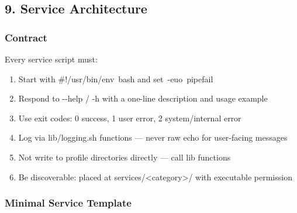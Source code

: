 \documentclass[11pt, a4paper, DIV=14]{scrartcl}
\renewcommand{\texttt}[1]{{\ttfamily\fontsize{8.5}{10.5}\selectfont\color{BabbNavy}#1}}
\let\origRule\rule
\renewcommand{\rule}[2]{\par\noindent{\color{BabbBorder}\origRule{#1}{#2}}\par}
\begin{document}
\begin{center}\rule{0.5\linewidth}{0.5pt}\end{center}

\subsection{9. Service Architecture}\label{service-architecture}

\subsubsection{Contract}\label{contract}

Every service script must:

\begin{enumerate}
\def\labelenumi{\arabic{enumi}.}
\tightlist
\item
  Start with \texttt{\#!/usr/bin/env\ bash} and
  \texttt{set\ -euo\ pipefail}
\item
  Respond to \texttt{-\/-help} / \texttt{-h} with a one-line description
  and usage example
\item
  Use exit codes: \texttt{0} success, \texttt{1} user error, \texttt{2}
  system/internal error
\item
  Log via \texttt{lib/logging.sh} functions --- never raw \texttt{echo}
  for user-facing messages
\item
  Not write to profile directories directly --- call lib functions
\item
  Be discoverable: placed at
  \texttt{services/\textless{}category\textgreater{}/} with executable
  permission
\end{enumerate}

\subsubsection{Minimal Service Template}\label{minimal-service-template}
\end{document}
